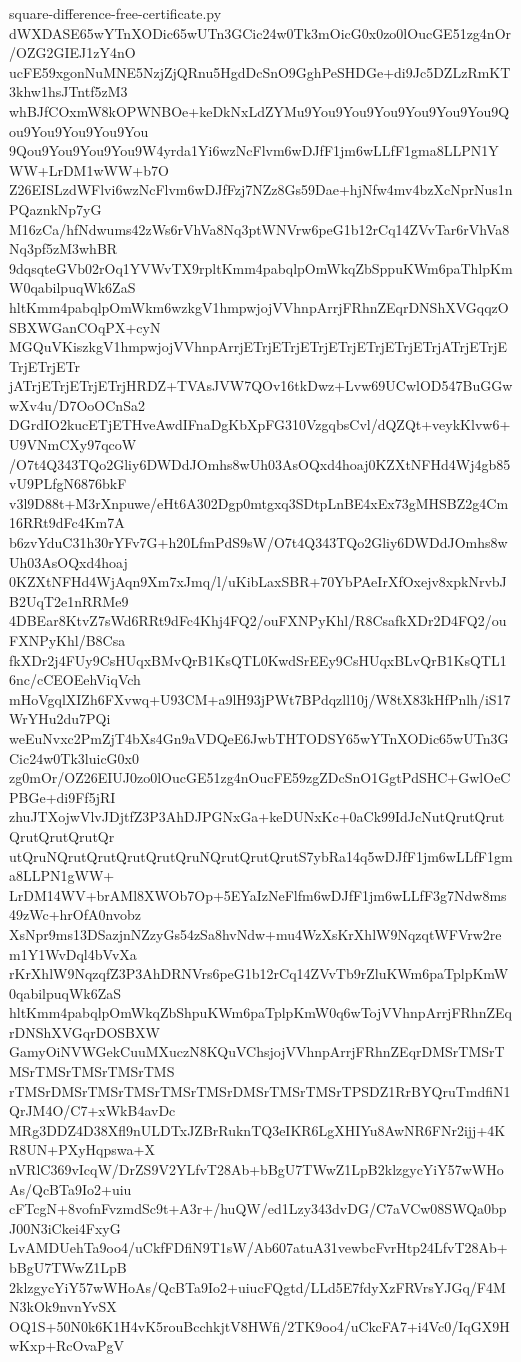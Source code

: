 \documentclass[11pt]{article}
\theoremstyle{definition}
\theoremstyle{remark}
\begin{document}
\begin{filecontents*}[overwrite]{square-difference-free-certificate.py}
dWXDASE65wYTnXODic65wUTn3GCic24w0Tk3mOicG0x0zo0lOucGE51zg4nOr/OZG2GIEJ1zY4nO
ucFE59xgonNuMNE5NzjZjQRnu5HgdDcSnO9GghPeSHDGe+di9Jc5DZLzRmKT3khw1hsJTntf5zM3
whBJfCOxmW8kOPWNBOe+keDkNxLdZYMu9You9You9You9You9You9You9Qou9You9You9You9You
9Qou9You9You9You9W4yrda1Yi6wzNcFlvm6wDJfF1jm6wLLfF1gma8LLPN1YWW+LrDM1wWW+b7O
Z26EISLzdWFlvi6wzNcFlvm6wDJfFzj7NZz8Gs59Dae+hjNfw4mv4bzXcNprNus1nPQaznkNp7yG
M16zCa/hfNdwums42zWs6rVhVa8Nq3ptWNVrw6peG1b12rCq14ZVvTar6rVhVa8Nq3pf5zM3whBR
9dqsqteGVb02rOq1YVWvTX9rpltKmm4pabqlpOmWkqZbSppuKWm6paThlpKmW0qabilpuqWk6ZaS
hltKmm4pabqlpOmWkm6wzkgV1hmpwjojVVhnpArrjFRhnZEqrDNShXVGqqzOSBXWGanCOqPX+cyN
MGQuVKiszkgV1hmpwjojVVhnpArrjETrjETrjETrjETrjETrjETrjETrjATrjETrjETrjETrjETr
jATrjETrjETrjETrjHRDZ+TVAsJVW7QOv16tkDwz+Lvw69UCwlOD547BuGGwwXv4u/D7OoOCnSa2
DGrdIO2kucETjETHveAwdIFnaDgKbXpFG310VzgqbsCvl/dQZQt+veykKlvw6+U9VNmCXy97qcoW
/O7t4Q343TQo2Gliy6DWDdJOmhs8wUh03AsOQxd4hoaj0KZXtNFHd4Wj4gb85vU9PLfgN6876bkF
v3l9D88t+M3rXnpuwe/eHt6A302Dgp0mtgxq3SDtpLnBE4xEx73gMHSBZ2g4Cm16RRt9dFc4Km7A
b6zvYduC31h30rYFv7G+h20LfmPdS9sW/O7t4Q343TQo2Gliy6DWDdJOmhs8wUh03AsOQxd4hoaj
0KZXtNFHd4WjAqn9Xm7xJmq/l/uKibLaxSBR+70YbPAeIrXfOxejv8xpkNrvbJB2UqT2e1nRRMe9
4DBEar8KtvZ7sWd6RRt9dFc4Khj4FQ2/ouFXNPyKhl/R8CsafkXDr2D4FQ2/ouFXNPyKhl/B8Csa
fkXDr2j4FUy9CsHUqxBMvQrB1KsQTL0KwdSrEEy9CsHUqxBLvQrB1KsQTL16nc/cCEOEehViqVch
mHoVgqlXIZh6FXvwq+U93CM+a9lH93jPWt7BPdqzll10j/W8tX83kHfPnlh/iS17WrYHu2du7PQi
weEuNvxc2PmZjT4bXs4Gn9aVDQeE6JwbTHTODSY65wYTnXODic65wUTn3GCic24w0Tk3luicG0x0
zg0mOr/OZ26EIUJ0zo0lOucGE51zg4nOucFE59zgZDcSnO1GgtPdSHC+GwlOeCPBGe+di9Ff5jRI
zhuJTXojwVlvJDjtfZ3P3AhDJPGNxGa+keDUNxKc+0aCk99IdJcNutQrutQrutQrutQrutQrutQr
utQruNQrutQrutQrutQrutQruNQrutQrutQrutS7ybRa14q5wDJfF1jm6wLLfF1gma8LLPN1gWW+
LrDM14WV+brAMl8XWOb7Op+5EYaIzNeFlfm6wDJfF1jm6wLLfF3g7Ndw8ms49zWc+hrOfA0nvobz
XsNpr9ms13DSazjnNZzyGs54zSa8hvNdw+mu4WzXsKrXhlW9NqzqtWFVrw2rem1Y1WvDql4bVvXa
rKrXhlW9NqzqfZ3P3AhDRNVrs6peG1b12rCq14ZVvTb9rZluKWm6paTplpKmW0qabilpuqWk6ZaS
hltKmm4pabqlpOmWkqZbShpuKWm6paTplpKmW0q6wTojVVhnpArrjFRhnZEqrDNShXVGqrDOSBXW
GamyOiNVWGekCuuMXuczN8KQuVChsjojVVhnpArrjFRhnZEqrDMSrTMSrTMSrTMSrTMSrTMSrTMS
rTMSrDMSrTMSrTMSrTMSrTMSrDMSrTMSrTMSrTPSDZ1RrBYQruTmdfiN1QrJM4O/C7+xWkB4avDc
MRg3DDZ4D38Xfl9nULDTxJZBrRuknTQ3eIKR6LgXHIYu8AwNR6FNr2ijj+4KR8UN+PXyHqpswa+X
nVRlC369vIcqW/DrZS9V2YLfvT28Ab+bBgU7TWwZ1LpB2klzgycYiY57wWHoAs/QcBTa9Io2+uiu
cFTcgN+8vofnFvzmdSc9t+A3r+/huQW/ed1Lzy343dvDG/C7aVCw08SWQa0bpJ00N3iCkei4FxyG
LvAMDUehTa9oo4/uCkfFDfiN9T1sW/Ab607atuA31vewbcFvrHtp24LfvT28Ab+bBgU7TWwZ1LpB
2klzgycYiY57wWHoAs/QcBTa9Io2+uiucFQgtd/LLd5E7fdyXzFRVrsYJGq/F4MN3kOk9nvnYvSX
OQ1S+50N0k6K1H4vK5rouBcchkjtV8HWfi/2TK9oo4/uCkcFA7+i4Vc0/IqGX9HwKxp+RcOvaPgV

\end{filecontents*}
\end{document}

